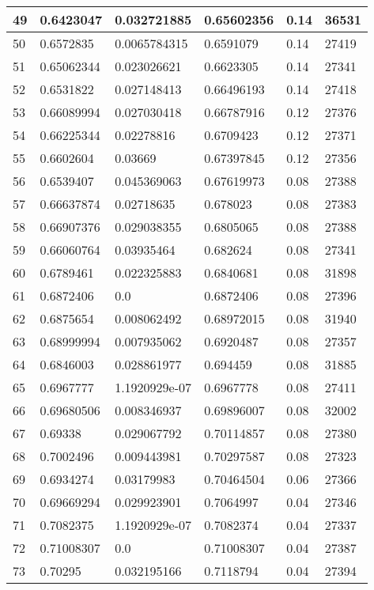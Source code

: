 \begin{longtable}{|l|l|l|l|l|l|}
49 & 0.6423047 & 0.032721885 & 0.65602356 & 0.14 & 36531 \\ \hline 
50 & 0.6572835 & 0.0065784315 & 0.6591079 & 0.14 & 27419 \\ \hline 
51 & 0.65062344 & 0.023026621 & 0.6623305 & 0.14 & 27341 \\ \hline 
52 & 0.6531822 & 0.027148413 & 0.66496193 & 0.14 & 27418 \\ \hline 
53 & 0.66089994 & 0.027030418 & 0.66787916 & 0.12 & 27376 \\ \hline 
54 & 0.66225344 & 0.02278816 & 0.6709423 & 0.12 & 27371 \\ \hline 
55 & 0.6602604 & 0.03669 & 0.67397845 & 0.12 & 27356 \\ \hline 
56 & 0.6539407 & 0.045369063 & 0.67619973 & 0.08 & 27388 \\ \hline 
57 & 0.66637874 & 0.02718635 & 0.678023 & 0.08 & 27383 \\ \hline 
58 & 0.66907376 & 0.029038355 & 0.6805065 & 0.08 & 27388 \\ \hline 
59 & 0.66060764 & 0.03935464 & 0.682624 & 0.08 & 27341 \\ \hline 
60 & 0.6789461 & 0.022325883 & 0.6840681 & 0.08 & 31898 \\ \hline 
61 & 0.6872406 & 0.0 & 0.6872406 & 0.08 & 27396 \\ \hline 
62 & 0.6875654 & 0.008062492 & 0.68972015 & 0.08 & 31940 \\ \hline 
63 & 0.68999994 & 0.007935062 & 0.6920487 & 0.08 & 27357 \\ \hline 
64 & 0.6846003 & 0.028861977 & 0.694459 & 0.08 & 31885 \\ \hline 
65 & 0.6967777 & 1.1920929e-07 & 0.6967778 & 0.08 & 27411 \\ \hline 
66 & 0.69680506 & 0.008346937 & 0.69896007 & 0.08 & 32002 \\ \hline 
67 & 0.69338 & 0.029067792 & 0.70114857 & 0.08 & 27380 \\ \hline 
68 & 0.7002496 & 0.009443981 & 0.70297587 & 0.08 & 27323 \\ \hline 
69 & 0.6934274 & 0.03179983 & 0.70464504 & 0.06 & 27366 \\ \hline 
70 & 0.69669294 & 0.029923901 & 0.7064997 & 0.04 & 27346 \\ \hline 
71 & 0.7082375 & 1.1920929e-07 & 0.7082374 & 0.04 & 27337 \\ \hline 
72 & 0.71008307 & 0.0 & 0.71008307 & 0.04 & 27387 \\ \hline 
73 & 0.70295 & 0.032195166 & 0.7118794 & 0.04 & 27394 \\ \hline 

\end{longtable}
